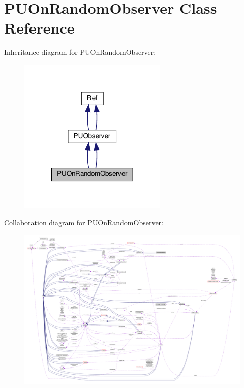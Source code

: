 \hypertarget{classPUOnRandomObserver}{}\section{P\+U\+On\+Random\+Observer Class Reference}
\label{classPUOnRandomObserver}


Inheritance diagram for P\+U\+On\+Random\+Observer\+:
\nopagebreak
\begin{figure}[H]
\begin{center}
\leavevmode
\includegraphics[width=200pt]{classPUOnRandomObserver__inherit__graph}
\end{center}
\end{figure}


Collaboration diagram for P\+U\+On\+Random\+Observer\+:
\nopagebreak
\begin{figure}[H]
\begin{center}
\leavevmode
\includegraphics[width=350pt]{classPUOnRandomObserver__coll__graph}
\end{center}
\end{figure}

